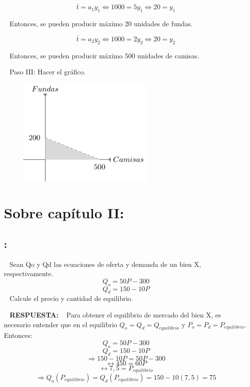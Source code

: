 \documentclass[
  letterpaper,
  DIV=11,
  numbers=noendperiod]{scrreport}
\begin{document}
\[\bar t=a_1y_1 \Leftrightarrow 1000=5y_1 \Leftrightarrow 20=y_1\]

~ Entonces, se pueden producir máximo 20 unidades de fundas.

\[\bar t=a_2y_2 \Leftrightarrow 1000=2y_2 \Leftrightarrow 20=y_2\]

~ Entonces, se pueden producir máximo 500 unidades de camisas.

~ Paso III: Hacer el gráfico.

\begin{figure}

{\centering \includegraphics[width=0.6\textwidth,height=\textheight]{7,8titulo_files/figure-pdf/unnamed-chunk-11-1.pdf}

}

\end{figure}

\hypertarget{sobre-capuxedtulo-ii}{%
\section{Sobre capítulo II:}\label{sobre-capuxedtulo-ii}}

\hypertarget{section-7}{%
\subsection{:}\label{section-7}}

~ Sean Qo y Qd las ecuaciones de oferta y demanda de un bien X,
respectivamente. \[Q_o = 50P-300\] \[Q_d=150-10P\] ~ Calcule el precio y
cantidad de equilibrio.

~ \textbf{RESPUESTA:} ~ Para obtener el equilibrio de mercado del bien
X, es necesario entender que en el equilibrio
\(Q_o = Q_d=Q_{equilibrio}\) y \(P_o = P_d=P_{equilibrio}\). Entonces:
\[Q_o = 50P-300\] \[Q_d=150-10P\] \[\Rightarrow 150 -10P=50P-300\]
\[ \leftrightarrow 450=60P\] \[ \leftrightarrow 7,5=P_{equilibrio}\]
\[\Rightarrow Q_o(P_{equilibrio})=Q_d(P_{equilibrio})=150 -10(7,5)=75\]
\end{document}
